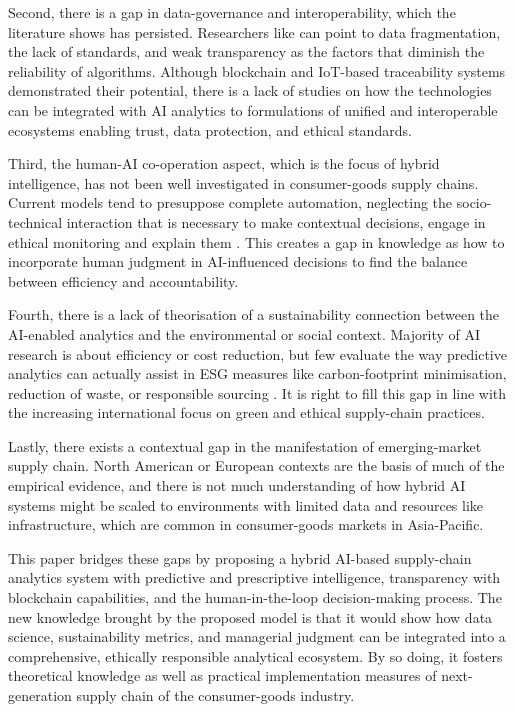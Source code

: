Second, there is a gap in data-governance and interoperability, which the literature shows has persisted. Researchers like \autocite{kache2017challenges} can point to data fragmentation, the lack of standards, and weak transparency as the factors that diminish the reliability of algorithms. Although blockchain and IoT-based traceability systems demonstrated their potential, there is a lack of studies on how the technologies can be integrated with AI analytics to formulations of unified and interoperable ecosystems enabling trust, data protection, and ethical standards.

Third, the human-AI co-operation aspect, which is the focus of hybrid intelligence, has not been well investigated in consumer-goods supply chains. Current models tend to presuppose complete automation, neglecting the socio-technical interaction that is necessary to make contextual decisions, engage in ethical monitoring and explain them \autocite{arrieta2020explainable}. This creates a gap in knowledge as how to incorporate human judgment in AI-influenced decisions to find the balance between efficiency and accountability.

Fourth, there is a lack of theorisation of a sustainability connection between the AI-enabled analytics and the environmental or social context. Majority of AI research is about efficiency or cost reduction, but few evaluate the way predictive analytics can actually assist in ESG measures like carbon-footprint minimisation, reduction of waste, or responsible sourcing \autocite{nogueira2021sustainable}. It is right to fill this gap in line with the increasing international focus on green and ethical supply-chain practices.

Lastly, there exists a contextual gap in the manifestation of emerging-market supply chain. North American or European contexts are the basis of much of the empirical evidence, and there is not much understanding of how hybrid AI systems might be scaled to environments with limited data and resources like infrastructure, which are common in consumer-goods markets in Asia-Pacific.

This paper bridges these gaps by proposing a hybrid AI-based supply-chain analytics system with predictive and prescriptive intelligence, transparency with blockchain capabilities, and the human-in-the-loop decision-making process. The new knowledge brought by the proposed model is that it would show how data science, sustainability metrics, and managerial judgment can be integrated into a comprehensive, ethically responsible analytical ecosystem. By so doing, it fosters theoretical knowledge as well as practical implementation measures of next-generation supply chain of the consumer-goods industry.


